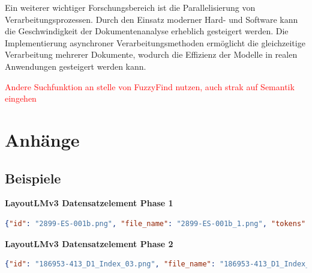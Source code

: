 \documentclass[12pt,a4paper,twoside]{article}
\newcommand\myworries[1]{\textcolor{red}{#1}}
\begin{document}
Ein weiterer wichtiger Forschungsbereich ist die Parallelisierung von Verarbeitungsprozessen. Durch den Einsatz moderner Hard- und Software kann die Geschwindigkeit der Dokumentenanalyse erheblich gesteigert werden. Die Implementierung asynchroner Verarbeitungsmethoden ermöglicht die gleichzeitige Verarbeitung mehrerer Dokumente, wodurch die Effizienz der Modelle in realen Anwendungen gesteigert werden kann.

\myworries{Andere Suchfunktion an stelle von FuzzyFind nutzen, auch strak auf Semantik eingehen}



\section{Anhänge}
\subsection{Beispiele}

\label{sec:Phase1}
\textbf{LayoutLMv3 Datensatzelement Phase 1}
\begin{lstlisting}[language=json,firstnumber=1]
{"id": "2899-ES-001b.png", "file_name": "2899-ES-001b_1.png", "tokens": ["Werkstattzeichnung"], "bboxes": [[4307, 3108, 4552, 3147]], "ner_tags": [2]}
\end{lstlisting}


\label{sec:Phase2}
\textbf{LayoutLMv3 Datensatzelement Phase 2}
\begin{lstlisting}[language=json,firstnumber=1]
{"id": "186953-413_D1_Index_03.png", "file_name": "186953-413_D1_Index_03.png", "tokens": ["D\u00e4mpfender Abstandhalter", "PFISTERER Switzerland AG"], "bboxes": [[818, 875, 1136, 908], [818, 1037, 1047, 1057]], "ner_tags": [2, 0]}
\end{lstlisting}
\end{document}
